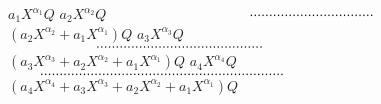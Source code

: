 \documentclass{mai_book}
\begin{document}
\begin{wrapfigure}{l}{0.5\textwidth} %
\hspace*{140.pt}\underline{$a_{1}X^{\alpha _1}Q$}\newline
\hspace*{100.pt}\underline{$a_{2}X^{\alpha _2}Q$}$\\
\hspace*{80.pt}\hbox to 4 cm{\qquad\leaders\hbox{$\cdot$}\hfill }$\newline
\hspace*{100.pt}\underline{$(a_{2}X^{\alpha _2} + a_{1}X^{\alpha _1})Q$}\newline
\hspace*{60.pt}\underline{$a_{3}X^{\alpha _3}Q$}$\\
\hspace*{40.pt}\hbox to 5 cm{\qquad\leaders\hbox{$\cdot$}\hfill }$\newline
\hspace*{60.pt}\underline{$(a_{3}X^{\alpha _3} + a_{2}X^{\alpha _2} + a_{1}X^{\alpha _1})Q $}\newline
\hspace*{20.pt}\underline{$a_{4}X^{\alpha _4}Q$}$\\
\hbox to 7 cm{\qquad\leaders\hbox{$\cdot$}\hfill }$\newline
\hspace*{20.pt}\underline{$(a_{4}X^{\alpha _4} + a_{3}X^{\alpha _3} + a_{2}X^{\alpha _2} + a_{1}X^{\alpha _1})Q$}\newline

\end{wrapfigure}
\end{document}
